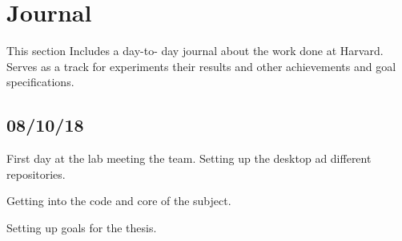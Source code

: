\section{Journal}
\label{s:Journal}

This section Includes a day-to- day journal about the work done at Harvard. Serves as a track for experiments their results and other achievements and goal specifications.


\subsection{08/10/18}

First day at the lab meeting the team. Setting up the desktop ad different repositories. 

Getting into the code and core of the subject.

Setting up goals for the thesis. 

